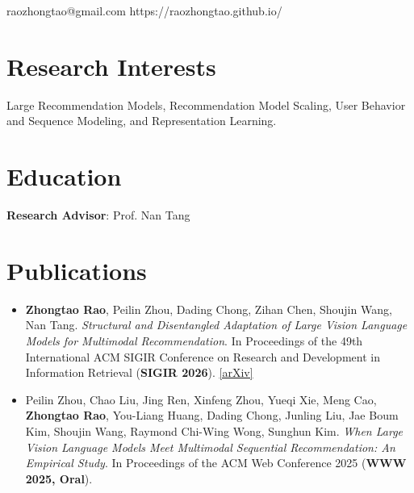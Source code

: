 \documentclass{resume}
\begin{document}


\contactInfo
{raozhongtao@gmail.com}
{https://raozhongtao.github.io/}


\section{Research Interests}

Large Recommendation Models, Recommendation Model Scaling,
User Behavior and Sequence Modeling, and Representation Learning.

\section{Education}


\textbf{Research Advisor}: Prof. Nan Tang

\vspace{0.3em}


\section{Publications}

\begin{itemize}

\item
\textbf{Zhongtao Rao}, Peilin Zhou, Dading Chong, Zihan Chen,
Shoujin Wang, Nan Tang.
\textit{Structural and Disentangled Adaptation of Large Vision Language Models
for Multimodal Recommendation}.
In Proceedings of the 49th International ACM SIGIR Conference on Research and
Development in Information Retrieval (\textbf{SIGIR 2026}).
\href{https://arxiv.org/abs/2512.06883}{[arXiv]}

\item
Peilin Zhou, Chao Liu, Jing Ren, Xinfeng Zhou, Yueqi Xie, Meng Cao,
\textbf{Zhongtao Rao}, You-Liang Huang, Dading Chong, Junling Liu,
Jae Boum Kim, Shoujin Wang, Raymond Chi-Wing Wong, Sunghun Kim.
\textit{When Large Vision Language Models Meet Multimodal Sequential
Recommendation: An Empirical Study}.
In Proceedings of the ACM Web Conference 2025
(\textbf{WWW 2025, Oral}).

\end{itemize}
\end{document}
